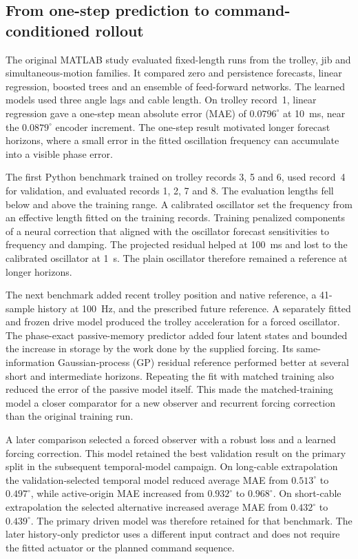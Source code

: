 \subsection{From one-step prediction to command-conditioned rollout}

The original MATLAB study evaluated fixed-length runs from the trolley, jib and simultaneous-motion families. It compared zero and persistence forecasts, linear regression, boosted trees and an ensemble of feed-forward networks. The learned models used three angle lags and cable length. On trolley record~1, linear regression gave a one-step mean absolute error (MAE) of $0.0796^\circ$ at 10~ms, near the $0.0879^\circ$ encoder increment. The one-step result motivated longer forecast horizons, where a small error in the fitted oscillation frequency can accumulate into a visible phase error.

The first Python benchmark trained on trolley records 3, 5 and 6, used record~4 for validation, and evaluated records 1, 2, 7 and 8. The evaluation lengths fell below and above the training range. A calibrated oscillator set the frequency from an effective length fitted on the training records. Training penalized components of a neural correction that aligned with the oscillator forecast sensitivities to frequency and damping. The projected residual helped at 100~ms and lost to the calibrated oscillator at 1~s. The plain oscillator therefore remained a reference at longer horizons.

The next benchmark added recent trolley position and native reference, a 41-sample history at 100~Hz, and the prescribed future reference. A separately fitted and frozen drive model produced the trolley acceleration for a forced oscillator. The phase-exact passive-memory predictor added four latent states and bounded the increase in storage by the work done by the supplied forcing. Its same-information Gaussian-process (GP) residual reference performed better at several short and intermediate horizons. Repeating the fit with matched training also reduced the error of the passive model itself. This made the matched-training model a closer comparator for a new observer and recurrent forcing correction than the original training run.

A later comparison selected a forced observer with a robust loss and a learned forcing correction. This model retained the best validation result on the primary split in the subsequent temporal-model campaign. On long-cable extrapolation the validation-selected temporal model reduced average MAE from $0.513^\circ$ to $0.497^\circ$, while active-origin MAE increased from $0.932^\circ$ to $0.968^\circ$. On short-cable extrapolation the selected alternative increased average MAE from $0.432^\circ$ to $0.439^\circ$. The primary driven model was therefore retained for that benchmark. The later history-only predictor uses a different input contract and does not require the fitted actuator or the planned command sequence.

